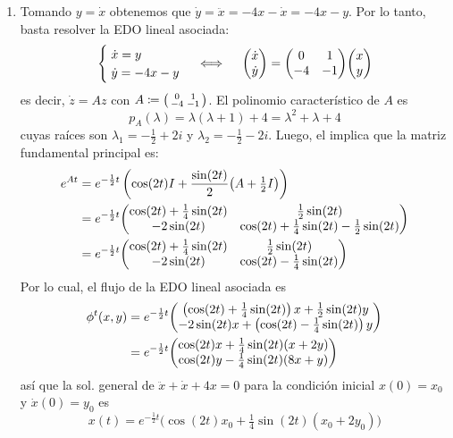 \begin{sol}
\begin{enumerate}[leftmargin=*, label=(\alph*)]
\item Tomando $y = \dot{x}$ obtenemos que $\dot{y} = \ddot{x} = - 4x - \dot{x} = -4x - y$. Por lo tanto, basta resolver la EDO lineal asociada:
\[
\begin{cases}
    \;\dot{x} = y\\
    \;\dot{y} = -4x - y
\end{cases}
\iff\quad%
\mqty(\dot{x}\\\dot{y}) = \mqty(0&1\\-4&-1)\mqty(x\\y)
\]
es decir, $\dot{z} = Az$ con $A \coloneq \smqty(0&1\\-4&-1)$. El polinomio característico de $A$ es 
\[
p_A(\lambda)%
= \lambda(\lambda+1) + 4%
= \lambda^2 + \lambda + 4
\]
cuyas raíces son
\(
\lambda_1 = -\frac12 + 2i\) y \(\lambda_2 = -\frac12 - 2i.
\)
Luego, el  implica que la matriz fundamental principal es:
\begin{align*}
e^{At}%
&= e^{-\frac12t} \left( \cos(2t) I + \frac{\sin(2t)}{2} \big(A + \tfrac12I\big) \right)\\
&= e^{-\frac12t}\mqty(%
\cos(2t) + \tfrac14\sin(2t) & \tfrac12\sin(2t)\\
-2\sin(2t) & \cos(2t) + \tfrac14\sin(2t) - \tfrac12\sin(2t)
)\\
&= e^{-\frac12t}\mqty(%
\cos(2t) + \tfrac14\sin(2t) & \tfrac12\sin(2t)\\
-2\sin(2t) & \cos(2t) - \tfrac14\sin(2t)
)
\end{align*}
Por lo cual, el flujo de la EDO lineal asociada es
\begin{align*}
\phi^t(x,y)%
&= e^{-\frac12t} \mqty(%
\left(\cos(2t) + \tfrac14\sin(2t)\right)x + \tfrac12\sin(2t)y\\
-2\sin(2t)x + \left(\cos(2t) - \tfrac14\sin(2t)\right)y
)\\
&= e^{-\frac12t} \mqty(%
\cos(2t)x + \tfrac14\sin(2t)(x + 2y)\\
\cos(2t)y - \tfrac14\sin(2t)(8x + y)
)
\end{align*}
así que la sol. general de $\ddot{x} + \dot{x} + 4x = 0$ para la condición inicial $x(0) = x_0$ y $\dot{x}(0) = y_0$ es
\[
x(t) = e^{-\frac12t} \big(\cos(2t)x_0 + \tfrac14\sin(2t)(x_0 + 2y_0)\big)
\]


\end{enumerate}
\end{sol}
